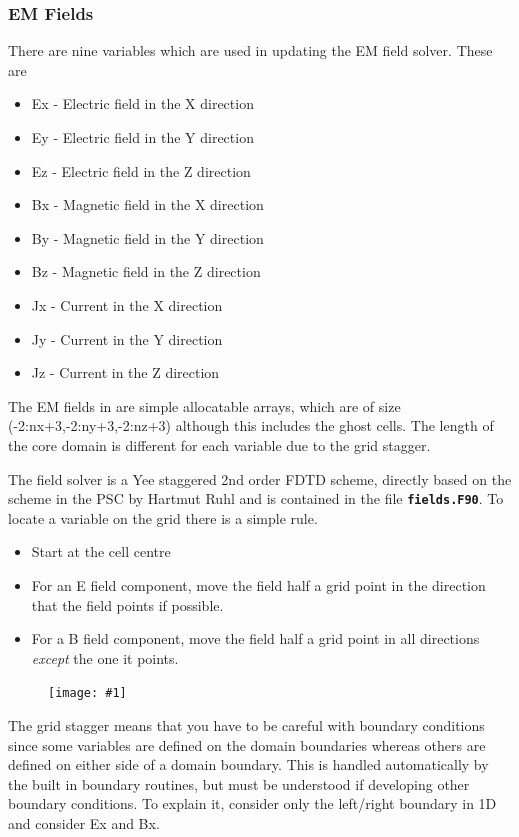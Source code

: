 \documentclass[12pt,a4paper]{article}
\newcommand{\inlinecode}[1]{{\color{warwickred} \bf\texttt{#1}}}
\newcommand{\EPOCH}{{\color{warwickdark}\fontfamily{phv}\selectfont{EPOCH}}}
\newcommand{\image}[1]
  {{\begin{figure}[hbt!]\centering\texttt{[image: \#1]}\end{figure}}}
\begin{document}
\subsubsection{EM Fields}
There are nine variables which are used in updating the EM field solver. These
are
\begin{itemize}
\item Ex - Electric field in the X direction
\item Ey - Electric field in the Y direction
\item Ez - Electric field in the Z direction
\item Bx - Magnetic field in the X direction
\item By - Magnetic field in the Y direction
\item Bz - Magnetic field in the Z direction
\item Jx - Current in the X direction
\item Jy - Current in the Y direction
\item Jz - Current in the Z direction
\end{itemize}
The EM fields in {\EPOCH} are simple allocatable arrays, which are of size
(-2:nx+3,-2:ny+3,-2:nz+3) although this includes the ghost cells. The length of
the core domain is different for each variable due to the grid stagger.

The {\EPOCH} field solver is a Yee staggered 2nd order FDTD scheme, directly
based on the scheme in the PSC by Hartmut Ruhl and is contained in the file
\inlinecode{fields.F90}. To locate a variable on the grid there is a simple
rule.
\begin{itemize}
\item Start at the cell centre
\item For an E field component, move the field half a grid point in the
  direction that the field points if possible.
\item For a B field component, move the field half a grid point in all
  directions {\it except} the one it points.
\end{itemize}

\image{./images/stagger}

The grid stagger means that you have to be careful with boundary conditions
since some variables are defined on the domain boundaries whereas others are
defined on either side of a domain boundary. This is handled automatically by
the built in boundary routines, but must be understood if developing other
boundary conditions. To explain it, consider only the left/right boundary in 1D
and consider Ex and Bx.\\
\end{document}
